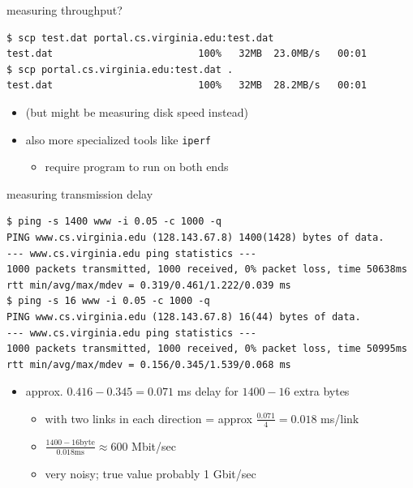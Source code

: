 \begin{frame}[fragile]{measuring throughput?}
\begin{Verbatim}[fontsize=\fontsize{10}{11}]
$ scp test.dat portal.cs.virginia.edu:test.dat
test.dat                         100%   32MB  23.0MB/s   00:01    
$ scp portal.cs.virginia.edu:test.dat .
test.dat                         100%   32MB  28.2MB/s   00:01   
\end{Verbatim}
\begin{itemize}
\item (but might be measuring disk speed instead)
\vspace{.5cm}
\item also more specialized tools like \texttt{iperf}
    \begin{itemize}
    \item require program to run on both ends
    \end{itemize}
\end{itemize}
\end{frame}

\begin{frame}[fragile]{measuring transmission delay}
\begin{Verbatim}[fontsize=\fontsize{10}{11}]
$ ping -s 1400 www -i 0.05 -c 1000 -q
PING www.cs.virginia.edu (128.143.67.8) 1400(1428) bytes of data.
--- www.cs.virginia.edu ping statistics ---
1000 packets transmitted, 1000 received, 0% packet loss, time 50638ms
rtt min/avg/max/mdev = 0.319/0.461/1.222/0.039 ms
$ ping -s 16 www -i 0.05 -c 1000 -q
PING www.cs.virginia.edu (128.143.67.8) 16(44) bytes of data.
--- www.cs.virginia.edu ping statistics ---
1000 packets transmitted, 1000 received, 0% packet loss, time 50995ms
rtt min/avg/max/mdev = 0.156/0.345/1.539/0.068 ms
\end{Verbatim}
\begin{itemize}
\item approx. $0.416 - 0.345 = 0.071$ ms delay for $1400-16$ extra bytes
    \begin{itemize}
    \item with two links in each direction = approx $\frac{0.071}{4}=0.018$ ms/link
    \item $\frac{1400-16 \text{byte}}{0.018 \text{ms}} \approx 600$ Mbit/sec
    \item very noisy; true value probably 1 Gbit/sec
    \end{itemize}
\end{itemize}
\end{frame}
